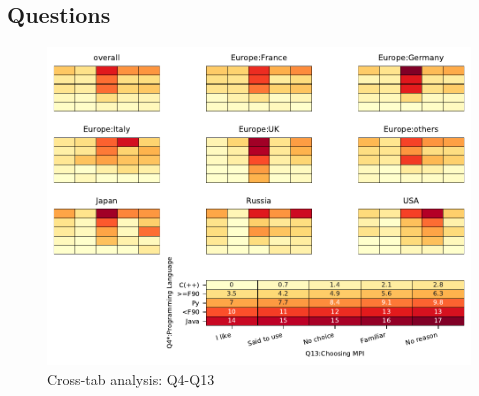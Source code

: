 
\subsection{Questions}


\begin{figure}
\begin{center}
\includegraphics[width=12cm]{../pdfs/Q4-Q13.pdf}
\caption{Cross-tab analysis: Q4-Q13}
\label{fig:Q4-Q13}
\end{center}
\end{figure}
